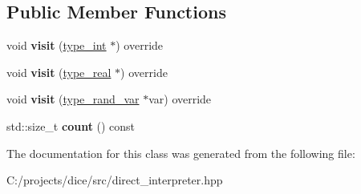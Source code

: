 \subsection*{Public Member Functions}
\begin{DoxyCompactItemize}
\item 
\mbox{\label{classdice_1_1dependencies__visitor_a4bad7d921d89d3b43e9dc1777e89292d}} 
void {\bfseries visit} (\mbox{\hyperlink{classdice_1_1typed__value}{type\+\_\+int}} $\ast$) override
\item 
\mbox{\label{classdice_1_1dependencies__visitor_aab1fb8058152378ec3bfc9720acdd4f9}} 
void {\bfseries visit} (\mbox{\hyperlink{classdice_1_1typed__value}{type\+\_\+real}} $\ast$) override
\item 
\mbox{\label{classdice_1_1dependencies__visitor_a6626a637371b68fd408355efac6b3709}} 
void {\bfseries visit} (\mbox{\hyperlink{classdice_1_1typed__value}{type\+\_\+rand\+\_\+var}} $\ast$var) override
\item 
\mbox{\label{classdice_1_1dependencies__visitor_a5fe2b4b97f27581470db143606191c4b}} 
std\+::size\+\_\+t {\bfseries count} () const
\end{DoxyCompactItemize}


The documentation for this class was generated from the following file\+:\begin{DoxyCompactItemize}
\item 
C\+:/projects/dice/src/direct\+\_\+interpreter.\+hpp\end{DoxyCompactItemize}
